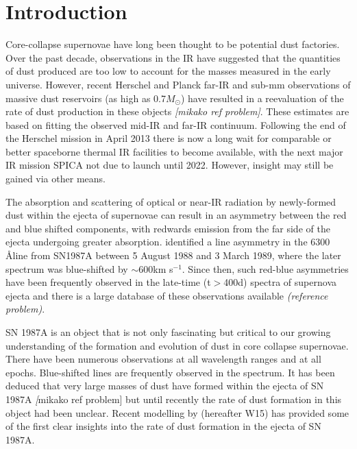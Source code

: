 \documentclass[useAMS,usenatbib,usegraphicx]{mnras}
\begin{document}
\section{Introduction}

Core-collapse supernovae have long been thought to be potential dust factories.  Over the past decade, observations in the IR have suggested that the quantities of dust produced are too low to account for the masses measured in the early universe.  However, recent Herschel and Planck far-IR and sub-mm observations of massive dust reservoirs (as high as 0.7$M_{\odot}$) have resulted in a reevaluation of the rate of dust production in these objects \citep{Barlow2010,Gomez2012b} \textit{[mikako ref problem]}.  These estimates are based on fitting the observed mid-IR and far-IR continuum. Following the end of the Herschel mission in April 2013 there is now a long wait for comparable or better spaceborne thermal IR facilities to become available, with the next major IR mission SPICA %
not due to launch until 2022.  However, insight may still be gained via other means.
   
The absorption and scattering of optical or near-IR radiation by newly-formed dust within the ejecta of supernovae can result in an asymmetry between the red and blue shifted components, with redwards emission from the far side of the ejecta undergoing greater absorption.  \citet{Lucy1989a} identified a line asymmetry in the 6300 \AA \:[OI] line from SN1987A between 5 August 1988 and 3 March 1989, where the later spectrum was blue-shifted by $\sim 600 $km s$^{-1}$. Since then, such red-blue asymmetries have been frequently observed in the late-time (t$>$400d) spectra of supernova ejecta and there is a large database of these observations available \textit{(reference problem)}. %

SN 1987A is an object that is not only fascinating but critical to our growing understanding of the formation and evolution of dust in core collapse supernovae.  There have been numerous observations at all wavelength ranges and at all epochs. Blue-shifted lines are frequently observed in the spectrum.  It has been deduced that very large masses of dust have formed within the ejecta of SN 1987A \textit[mikako ref problem] but until recently the rate of dust formation in this object had been unclear.  Recent modelling by \citet{Wesson2015} (hereafter W15) has provided some of the first clear insights into the rate of dust formation in the ejecta of SN 1987A.  
\end{document}
